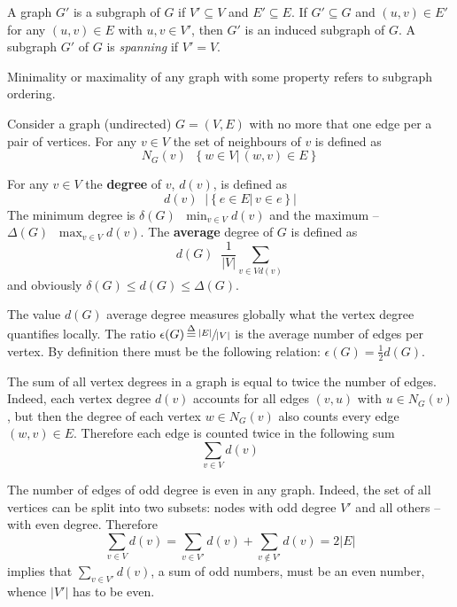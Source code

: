 \documentclass[a4paper]{article}
\newcommand{\obj}[1]{{\left\{ #1 \right \}}}
\newcommand{\induc}[1]{{\left . #1 \right \vert}}
\newcommand{\abs}[1]{{\left | #1 \right |}}
\newcommand{\defn}{\mathop{\overset{\Delta}{=}}\nolimits}
\begin{document}
A graph $G'$ is a subgraph of $G$ if $V'\subseteq V$ and $E'\subseteq E$.
If $G'\subseteq G$ and $(u,v)\in E'$ for any $(u,v)\in E$ with $u,v\in V'$, then $G'$ is an induced subgraph of $G$.
A subgraph $G'$ of $G$ is \emph{spanning} if $V'=V$.

Minimality or maximality of any graph with some property refers to subgraph ordering.

Consider a graph (undirected) $G=(V,E)$ with no more that one edge per a pair of vertices.
For any $v\in V$ the set of neighbours of $v$ is defined as
\[N_G(v) \defn \obj{\induc{w\in V}\, (w,v)\in E}\]

For any $v\in V$ the \textbf{degree} of $v$, $d(v)$, is defined as
\[d(v) \defn \abs{\obj{\induc{ e\in E }\, v\in e }}\]
The minimum degree is $\delta(G)\defn \min_{v\in V} d(v)$ and the maximum -- $\Delta(G) \defn \max_{v\in V} d(v)$.
The \textbf{average} degree of $G$ is defined as \[d(G) \defn \frac{1}{\abs{V}} \sum_{v\in V d(v)}\] and obviously $\delta(G)\leq d(G)\leq \Delta(G)$.

The value $d(G)$ average degree measures globally what the vertex degree quantifies locally.
The ratio $\epsilon(G) \defn \sfrac{\abs{E}}{\abs{V}}$ is the average number of edges per vertex.
By definition there must be the following relation: $\epsilon(G) = \frac{1}{2} d(G)$.

The sum of all vertex degrees in a graph is equal to twice the number of edges.
Indeed, each vertex degree $d(v)$ accounts for all edges $(v,u)$ with $u\in N_G(v)$,
but then the degree of each vertex $w\in N_G(v)$ also counts every edge $(w,v)\in E$.
Therefore each edge is counted twice in the following sum
\[\sum_{v\in V} d(v)\]

The number of edges of odd degree is even in any graph.
Indeed, the set of all vertices can be split into two subsets:
nodes with odd degree $V'$ and all others -- with even degree.
Therefore \[\sum_{v\in V}d(v) = \sum_{v\in V'}d(v) + \sum_{v\notin V'} d(v) = 2 \abs{E}\]
implies that $\sum_{v\in V'} d(v)$, a sum of odd numbers, must be an even number, whence $\abs{V'}$ has to be even.










\end{document}

